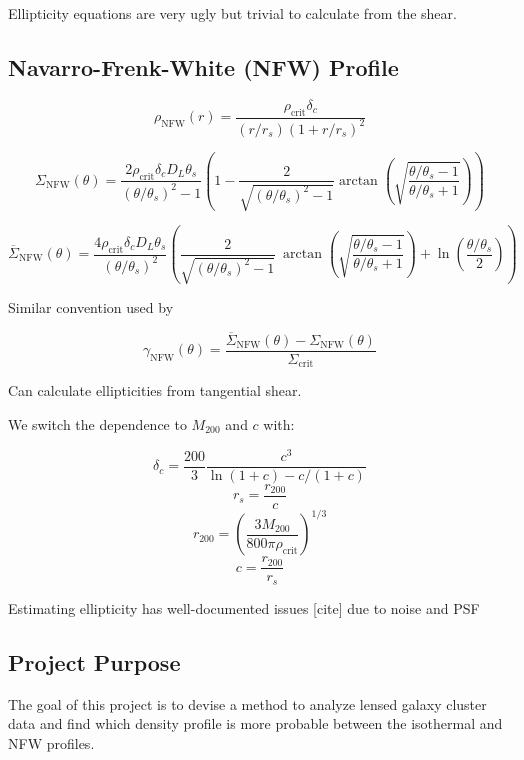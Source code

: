 \documentclass[10pt]{article}
\begin{document}
Ellipticity equations are very ugly but trivial to calculate from the shear.



\subsection{Navarro-Frenk-White (NFW) Profile}

\[\rho_\mathrm{NFW}(r) = \frac{\rho_\mathrm{crit} \delta_c}{(r/r_s)\left(1 + r/r_s\right)^2}\]

%
%
%

\[\Sigma_\mathrm{NFW}(\theta) = \frac{2 \rho_\mathrm{crit} \delta_c D_L \theta_s}{(\theta/\theta_s)^2 - 1} \left(1 - \frac{2}{\sqrt{(\theta/\theta_s)^2 - 1}} \arctan\left(\sqrt{\frac{\theta/\theta_s - 1}{\theta/\theta_s + 1}} \right) \right)\]

\[\overline{\Sigma}_\mathrm{NFW}(\theta) = \frac{4 \rho_\mathrm{crit} \delta_c D_L \theta_s}{(\theta/\theta_s)^2} \left(
    \frac{2}{\sqrt{(\theta/\theta_s)^2 - 1}} ~\arctan\left(\sqrt{\frac{\theta/\theta_s - 1}{\theta/\theta_s + 1}} \right) + \ln{\left(\frac{\theta/\theta_s}{2}\right)}
\right)\]

Similar convention used by \citet{Bartelmann2001}

\[\gamma_\mathrm{NFW}(\theta) = \frac{\overline{\Sigma}_\mathrm{NFW}(\theta) - \Sigma_\mathrm{NFW}(\theta)}{\Sigma_\mathrm{crit}} \]

Can calculate ellipticities from tangential shear.

We switch the dependence to $M_{200}$ and $c$ with:

\[\delta_c = \frac{200}{3} \frac{c^3}{\ln(1 + c) - c/(1 + c)}\]
\[r_s = \frac{r_{200}}{c}\]
\[r_{200} = \left( \frac{3 M_{200}}{800 \pi \rho_\mathrm{crit}} \right)^{1/3}\]
\[c = \frac{r_{200}}{r_s}\]

Estimating ellipticity has well-documented issues [cite] due to noise and PSF

\subsection{Project Purpose}
The goal of this project is to devise a method to analyze lensed galaxy cluster data and find which density profile is more probable between the isothermal and NFW profiles.
\end{document}
